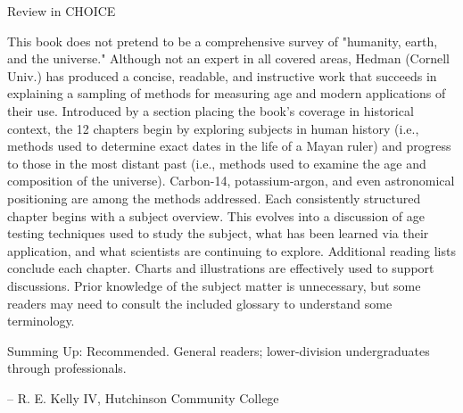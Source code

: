 
Review in CHOICE

This book does not pretend to be a comprehensive survey of "humanity, earth, and the universe." Although not an expert in all covered areas, Hedman (Cornell Univ.) has produced a concise, readable, and instructive work that succeeds in explaining a sampling of methods for measuring age and modern applications of their use. Introduced by a section placing the book's coverage in historical context, the 12 chapters begin by exploring subjects in human history (i.e., methods used to determine exact dates in the life of a Mayan ruler) and progress to those in the most distant past (i.e., methods used to examine the age and composition of the universe). Carbon-14, potassium-argon, and even astronomical positioning are among the methods addressed. Each consistently structured chapter begins with a subject overview. This evolves into a discussion of age testing techniques used to study the subject, what has been learned via their application, and what scientists are continuing to explore. Additional reading lists conclude each chapter. Charts and illustrations are effectively used to support discussions. Prior knowledge of the subject matter is unnecessary, but some readers may need to consult the included glossary to understand some terminology.

Summing Up: Recommended. General readers; lower-division undergraduates through professionals. 

-- R. E. Kelly IV, Hutchinson Community College

 